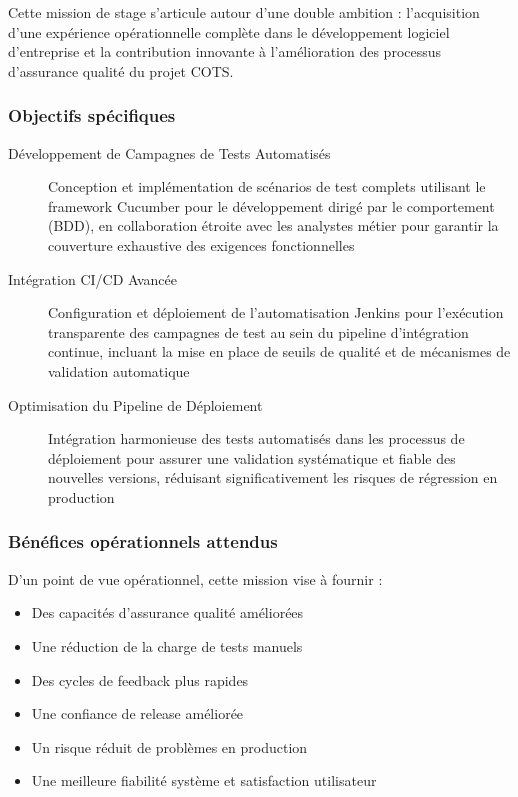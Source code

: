 Cette mission de stage s'articule autour d'une double ambition : l'acquisition d'une expérience opérationnelle complète dans le développement logiciel d'entreprise et la contribution innovante à l'amélioration des processus d'assurance qualité du projet COTS.

\subsubsection{Objectifs spécifiques}

\begin{description}
    \item[Développement de Campagnes de Tests Automatisés] Conception et implémentation de scénarios de test complets utilisant le framework Cucumber pour le développement dirigé par le comportement (BDD), en collaboration étroite avec les analystes métier pour garantir la couverture exhaustive des exigences fonctionnelles
    \item[Intégration CI/CD Avancée] Configuration et déploiement de l'automatisation Jenkins pour l'exécution transparente des campagnes de test au sein du pipeline d'intégration continue, incluant la mise en place de seuils de qualité et de mécanismes de validation automatique
    \item[Optimisation du Pipeline de Déploiement] Intégration harmonieuse des tests automatisés dans les processus de déploiement pour assurer une validation systématique et fiable des nouvelles versions, réduisant significativement les risques de régression en production
\end{description}

\subsubsection{Bénéfices opérationnels attendus}

D'un point de vue opérationnel, cette mission vise à fournir :
\begin{itemize}
    \item Des capacités d'assurance qualité améliorées
    \item Une réduction de la charge de tests manuels
    \item Des cycles de feedback plus rapides
    \item Une confiance de release améliorée
    \item Un risque réduit de problèmes en production
    \item Une meilleure fiabilité système et satisfaction utilisateur
\end{itemize}

